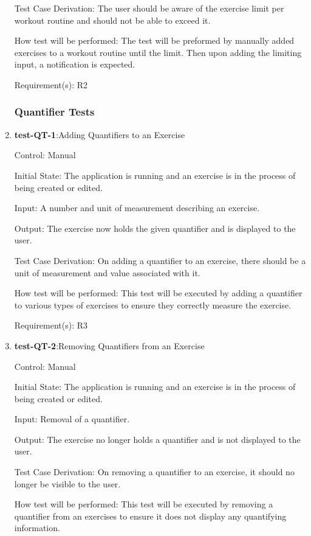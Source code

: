 \documentclass[12pt, titlepage]{article}
\begin{document}
\begin{enumerate}
		Test Case Derivation: The user should be aware of the exercise limit per workout routine and should not be able to exceed it.
		
		How test will be performed: The test will be preformed by manually added exercises to a workout routine until the limit. Then upon adding the limiting input, a notification is expected.
		
		Requirement(s): R2
		
		\subsubsection{Quantifier Tests}
		\item{\textbf{test-QT-1}}:Adding Quantifiers to an Exercise
		
		Control: Manual
		
		Initial State: The application is running and an exercise is in the process of being created or edited.
		
		Input: A number and unit of measurement describing an exercise.
		
		Output: The exercise now holds the given quantifier and is displayed to the user.
		
		Test Case Derivation: On adding a quantifier to an exercise, there should be a unit of measurement and value associated with it.
		
		How test will be performed: This test will be executed by adding a quantifier to various types of exercises to ensure they correctly measure the exercise.
		
		Requirement(s): R3
		
		\item{\textbf{test-QT-2}}:Removing Quantifiers from an Exercise
		
		Control: Manual
		
		Initial State: The application is running and an exercise is in the process of being created or edited.
		
		Input: Removal of a quantifier.
		
		Output: The exercise no longer holds a quantifier and is not displayed to the user.
		
		Test Case Derivation: On removing a quantifier to an exercise, it should no longer be visible to the user.
		
		How test will be performed: This test will be executed by removing a quantifier from an exercises to ensure it does not display any quantifying information.
		

\end{enumerate}
\end{document}

